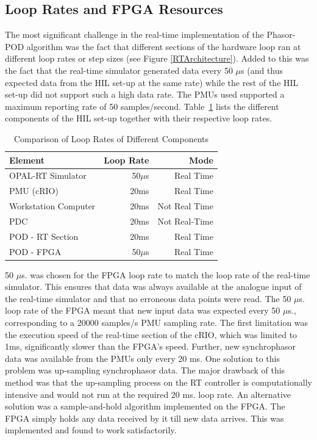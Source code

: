 \documentclass{ieeeaccess}
\begin{document}
\subsection{Loop Rates and FPGA Resources}\label{looprate}
The most significant challenge in the real-time implementation of the Phasor-POD algorithm was the fact that different sections of the hardware loop ran at different loop rates or step sizes (see Figure \ref{RTArchitecture}). Added to this was the fact that the real-time simulator generated data every 50 $\mu$s (and thus expected data from the HIL set-up at the same rate) while the rest of the HIL set-up did not support such a high data rate. The PMUs used supported a maximum reporting rate of 50 samples/second. Table~\ref{ex:LoopRates} lists the different components of the HIL set-up together with their respective loop rates.
\begin{table}[htpb]
\caption{Comparison of Loop Rates of Different Components}\label{ex:LoopRates}
\begin{center}
\begin{tabular}{|l|r|r|}
\hline \textbf{Element} & \textbf{Loop Rate} & \textbf{Mode} \\
\hline OPAL-RT Simulator & 50$\mu$s & Real Time \\ 
\hline PMU (cRIO) & 20ms & Real Time \\ 
\hline Workstation Computer& 20ms &Not Real Time\\ 
\hline PDC & 20ms &Not Real-Time\\ %
\hline POD - RT Section & 20ms & Real Time \\ 
\hline POD - FPGA & 50$\mu$s & Real Time \\ 
\hline 
\end{tabular}
\end{center}
\end{table} 

50 $\mu$s. was chosen for the FPGA loop rate to match the loop rate of the real-time simulator. This ensures that data was always available at the analogue input of the real-time simulator and that no erroneous data points were read. The 50 $\mu$s. loop rate of the FPGA meant that new input data was expected every 50 $\mu$s., corresponding to a 20000 samples/s PMU sampling rate. The first limitation was the execution speed of the real-time section of the cRIO, which was limited to 1ms, significantly slower than the FPGA\rq{s} speed. Further, new synchrophasor data was available from the PMUs only every 20 ms. One solution to this problem was up-sampling synchrophasor data. The major drawback of this method was that the up-sampling process on the RT controller is computationally intensive and would not run at the required 20 ms. loop rate. An alternative solution was a sample-and-hold algorithm implemented on the FPGA. The FPGA simply holds any data received by it till new data arrives. This was implemented and found to work satisfactorily.
\end{document}
